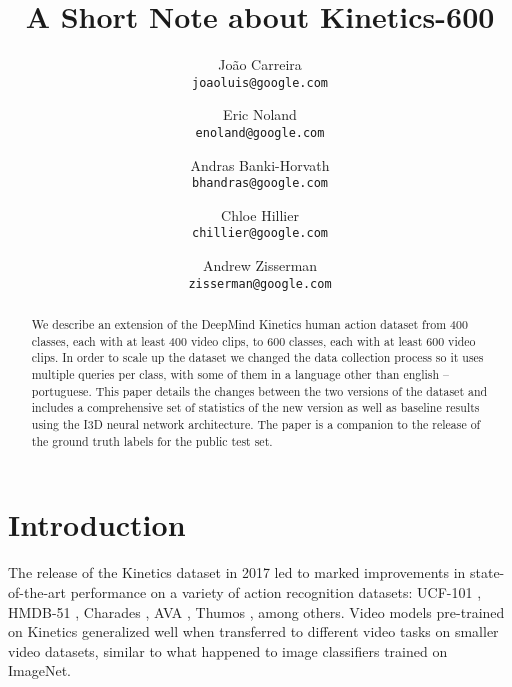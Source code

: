 \documentclass[10pt,twocolumn,letterpaper]{article}
\begin{document}
\title{A Short Note about Kinetics-600}

\author{{Jo\~a}o Carreira \\
{\tt\small joaoluis@google.com} \\
\and
Eric Noland \\
{\tt\small enoland@google.com} \\
\and
Andras Banki-Horvath \\ 
{\tt\small bhandras@google.com} \\
\and
Chloe Hillier \\
{\tt\small chillier@google.com} \\
\and
Andrew Zisserman \\
{\tt\small zisserman@google.com} \\
}

\maketitle

\begin{abstract}

We describe an extension of the DeepMind Kinetics human action dataset from 400 classes, each with at least 400 video clips, to 600 classes, each with at least 600 video clips. In order to scale up the dataset we changed the data collection process so it uses  multiple queries per class, with some of them in a language other than english -- portuguese. This paper details the changes between the two versions of the dataset and includes a comprehensive set of statistics of the new version as well as baseline  results using the I3D neural network architecture. The paper is a companion to the release of the ground truth labels for the public test set.
\end{abstract}

\section{Introduction}

The release of the Kinetics dataset \cite{kay2017kinetics} in 2017 led to marked improvements in state-of-the-art performance on a variety of action recognition datasets: UCF-101 \cite{soomro2012ucf101}, HMDB-51 \cite{Kuehne11}, Charades \cite{sigurdsson2016hollywood}, AVA \cite{gu2017ava}, Thumos \cite{jiang2014thumos}, among others. Video models pre-trained on Kinetics generalized well when transferred to different video tasks on smaller video datasets, similar to what happened to image classifiers trained on ImageNet.
\end{document}
